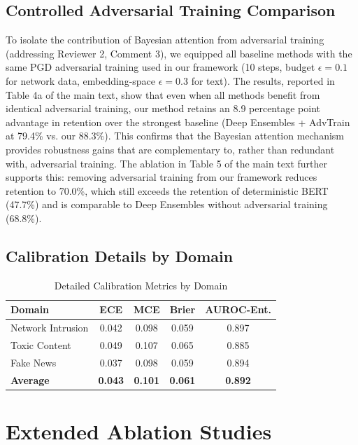 \documentclass[12pt,a4paper]{article}
\theoremstyle{definition}
\begin{document}
\subsection{Controlled Adversarial Training Comparison}

To isolate the contribution of Bayesian attention from adversarial training (addressing Reviewer 2, Comment 3), we equipped all baseline methods with the same PGD adversarial training used in our framework (10 steps, budget $\epsilon = 0.1$ for network data, embedding-space $\epsilon = 0.3$ for text). The results, reported in Table 4a of the main text, show that even when all methods benefit from identical adversarial training, our method retains an 8.9 percentage point advantage in retention over the strongest baseline (Deep Ensembles + AdvTrain at 79.4\% vs. our 88.3\%). This confirms that the Bayesian attention mechanism provides robustness gains that are complementary to, rather than redundant with, adversarial training. The ablation in Table 5 of the main text further supports this: removing adversarial training from our framework reduces retention to 70.0\%, which still exceeds the retention of deterministic BERT (47.7\%) and is comparable to Deep Ensembles without adversarial training (68.8\%).

\subsection{Calibration Details by Domain}

\begin{table}[H]
\caption{Detailed Calibration Metrics by Domain}
\label{tab:calibration_detailed}
\centering
\small
\begin{tabular}{@{}lcccc@{}}
\toprule
\textbf{Domain} & \textbf{ECE} & \textbf{MCE} & \textbf{Brier} & \textbf{AUROC-Ent.} \\
\midrule
Network Intrusion & 0.042 & 0.098 & 0.059 & 0.897 \\
Toxic Content & 0.049 & 0.107 & 0.065 & 0.885 \\
Fake News & 0.037 & 0.098 & 0.059 & 0.894 \\
\midrule
\textbf{Average} & \textbf{0.043} & \textbf{0.101} & \textbf{0.061} & \textbf{0.892} \\
\bottomrule
\end{tabular}
\end{table}

\section{Extended Ablation Studies}
\label{app:ablations}
\end{document}
